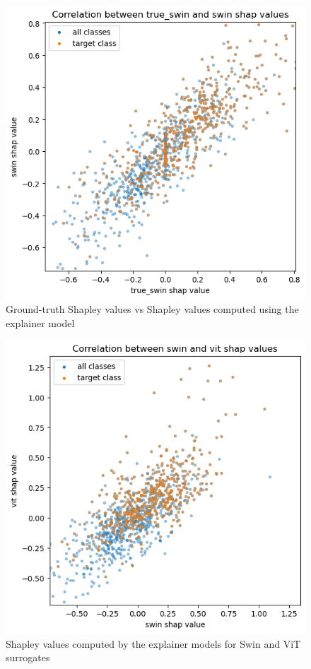 \documentclass[magisterska,en]{pracamgr}
\begin{document}
\begin{figure}[H]
\centering
\includegraphics[scale=0.5]{./images/correlation_swin_gastro.png}
\caption{Ground-truth Shapley values vs Shapley values computed using the explainer model}
\label{true_swin_swin_gastro}
\end{figure}


\begin{figure}[H]
\centering
\includegraphics[scale=0.5]{./images/vit_swin_gastro.png}
\caption{Shapley values computed by the explainer models for Swin and ViT surrogates}
\label{vit_swin_gastro}
\end{figure}
\end{document}
